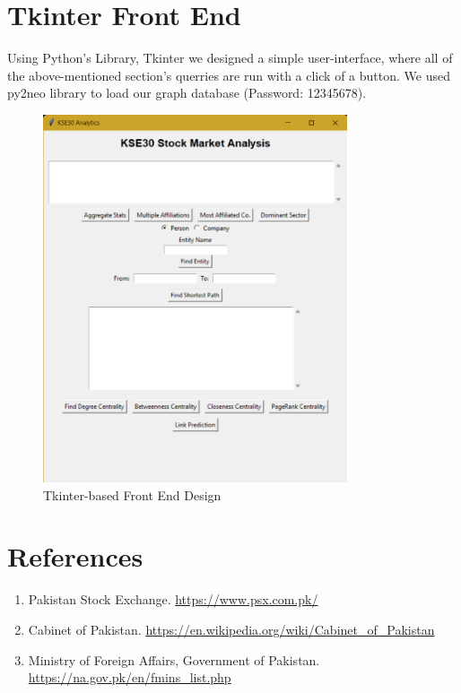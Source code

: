 \documentclass[12pt]{article}
\begin{document}
\section{Tkinter Front End}
Using Python's Library, Tkinter we designed a simple user-interface, where all of the above-mentioned section's querries are run with a click of a button. We used py2neo library to load our graph database (Password: 12345678).
\begin{figure}[H]
    \centering
    \includegraphics[width=0.8\textwidth]{frontend.png} 
    \caption{Tkinter-based Front End Design}
\end{figure}
\pagebreak
\section{References}
\begin{enumerate}
    \item Pakistan Stock Exchange. \url{https://www.psx.com.pk/}
    \item Cabinet of Pakistan. \url{https://en.wikipedia.org/wiki/Cabinet_of_Pakistan}
    \item Ministry of Foreign Affairs, Government of Pakistan. \url{https://na.gov.pk/en/fmins_list.php}
\end{enumerate}
\end{document}
